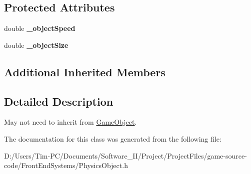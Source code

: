 \subsection*{Protected Attributes}
\begin{DoxyCompactItemize}
\item 
\mbox{\label{class_physics_object_a78112cdfb51ef4f1b3fbab6af4a9a592}} 
double {\bfseries \+\_\+object\+Speed}
\item 
\mbox{\label{class_physics_object_a417a7eb051cfcfdbf8dfd0cc0875fa0d}} 
double {\bfseries \+\_\+object\+Size}
\end{DoxyCompactItemize}
\subsection*{Additional Inherited Members}


\subsection{Detailed Description}
May not need to inherit from \hyperlink{class_game_object}{Game\+Object}. 

The documentation for this class was generated from the following file\+:\begin{DoxyCompactItemize}
\item 
D\+:/\+Users/\+Tim-\/\+P\+C/\+Documents/\+Software\+\_\+\+I\+I/\+Project/\+Project\+Files/game-\/source-\/code/\+Front\+End\+Systems/Physics\+Object.\+h\end{DoxyCompactItemize}
